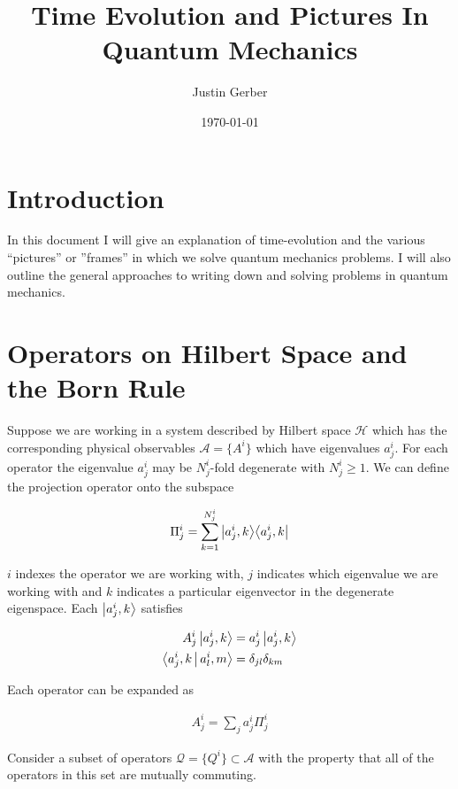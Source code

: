 \documentclass[12pt]{article}
\newcommand{\ketbra}[2]{\Ket{#1}\!\Bra{#2}}
\begin{document}
\title{Time Evolution and Pictures In Quantum Mechanics}
\author{Justin Gerber}
\date{\today}
\maketitle


\section{Introduction}


In this document I will give an explanation of time-evolution and the various ``pictures'' or ''frames'' in which we solve quantum mechanics problems. I will also outline the general approaches to writing down and solving problems in quantum mechanics.


\section{Operators on Hilbert Space and the Born Rule}


Suppose we are working in a system described by Hilbert space $\mathcal{H}$ which has the corresponding physical observables $\mathcal{A} = \{A^i\}$ which have eigenvalues $a^i_j$. For each operator the eigenvalue $a^i_j$ may be $N^i_j$-fold degenerate with $N^i_j \ge 1$. We can define the projection operator onto the subspace

\begin{align}
\Pi^i_j = \sum_{k=1}^{N^i_j} \ketbra{a^i_j,k}{a^i_j,k}
\end{align}

$i$ indexes the operator we are working with, $j$ indicates which eigenvalue we are working with and $k$ indicates a particular eigenvector in the degenerate eigenspace. Each $\Ket{a^i_j,k}$ satisfies

\begin{align}
A^i_j\Ket{a^i_j,k} &= a^i_j \Ket{a^i_j,k}\\
\Braket{a^i_j,k|a^i_l,m} &= \delta_{jl}\delta_{km}
\end{align}

Each operator can be expanded as

\begin{align}
A^i_j = \sum_j a^i_j \Pi^i_j
\end{align}

Consider a subset of operators $\mathcal{Q} = \{Q^i\}\subset \mathcal{A}$ with the property that all of the operators in this set are mutually commuting.
\end{document}
